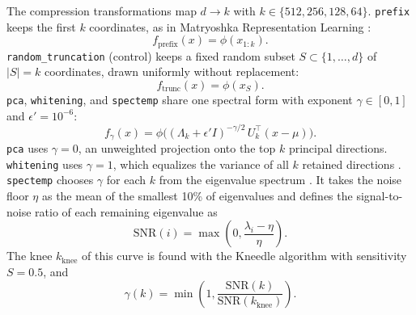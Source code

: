 The compression transformations map $d \to k$ with $k \in \{512, 256, 128, 64\}$. \texttt{prefix} keeps the first $k$ coordinates, as in Matryoshka Representation Learning \citep{kusupati2022matryoshka}:
\begin{equation}
f_{\text{prefix}}(x) = \phi(x_{1:k}).
\end{equation}
\texttt{random\_truncation} (control) keeps a fixed random subset $S \subset \{1, \dots, d\}$ of $|S| = k$ coordinates, drawn uniformly without replacement:
\begin{equation}
f_{\text{trunc}}(x) = \phi(x_S).
\end{equation}
\texttt{pca}, \texttt{whitening}, and \texttt{spectemp} share one spectral form \citep{li2026spectral} with exponent $\gamma \in [0, 1]$ and $\epsilon' = 10^{-6}$:
\begin{equation}
f_{\gamma}(x) = \phi\big((\Lambda_k + \epsilon' I)^{-\gamma/2}\, U_k^\top (x - \mu)\big).
\end{equation}
\texttt{pca} uses $\gamma = 0$, an unweighted projection onto the top $k$ principal directions. \texttt{whitening} uses $\gamma = 1$, which equalizes the variance of all $k$ retained directions \citep{su2021whitening}. \texttt{spectemp} chooses $\gamma$ for each $k$ from the eigenvalue spectrum \citep{li2026spectral}. It takes the noise floor $\eta$ as the mean of the smallest 10\% of eigenvalues and defines the signal-to-noise ratio of each remaining eigenvalue as
\begin{equation}
\mathrm{SNR}(i) = \max\!\left(0, \frac{\lambda_i - \eta}{\eta}\right).
\end{equation}
The knee $k_{\text{knee}}$ of this curve is found with the Kneedle algorithm \citep{satopaa2011finding} with sensitivity $S = 0.5$, and
\begin{equation}
\gamma(k) = \min\!\left(1, \frac{\mathrm{SNR}(k)}{\mathrm{SNR}(k_{\text{knee}})}\right).
\end{equation}

